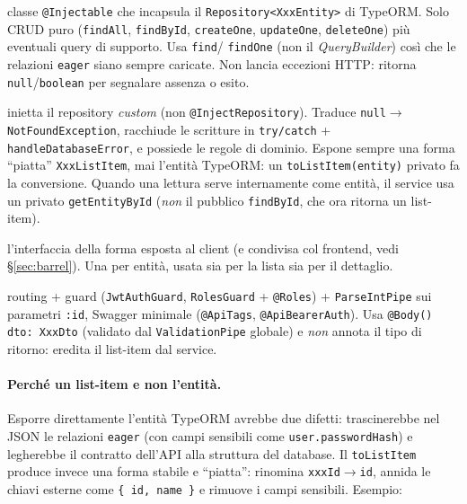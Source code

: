 \documentclass[11pt,a4paper,oneside]{report}
\newcommand{\code}[1]{\texttt{\small #1}}
\newcommand{\file}[1]{\texttt{\small #1}}
\begin{document}
\begin{description}[leftmargin=1.6em,style=nextline]
  \item[Repository (\file{xxx.repository.ts})] classe \code{@Injectable} che
        incapsula il \code{Repository<XxxEntity>} di TypeORM. Solo CRUD puro
        (\code{findAll}, \code{findById}, \code{createOne}, \code{updateOne},
        \code{deleteOne}) più eventuali query di supporto. Usa \code{find}/
        \code{findOne} (non il \emph{QueryBuilder}) così che le relazioni
        \code{eager} siano sempre caricate. Non lancia eccezioni HTTP: ritorna
        \code{null}/\code{boolean} per segnalare assenza o esito.
  \item[Service (\file{xxx.service.ts})] inietta il repository \emph{custom} (non
        \code{@InjectRepository}). Traduce \code{null}$\rightarrow$
        \code{NotFoundException}, racchiude le scritture in \code{try/catch} +
        \code{handleDatabaseError}, e possiede le regole di dominio. Espone
        sempre una forma ``piatta'' \code{XxxListItem}, mai l'entità TypeORM: un
        \code{toListItem(entity)} privato fa la conversione. Quando una lettura
        serve internamente come entità, il service usa un privato
        \code{getEntityById} (\emph{non} il pubblico \code{findById}, che ora
        ritorna un list-item).
  \item[List-item (\file{interfaces/xxx-list-item.interface.ts})] l'interfaccia
        della forma esposta al client (e condivisa col frontend, vedi
        \S\ref{sec:barrel}). Una per entità, usata sia per la lista sia per il
        dettaglio.
  \item[Controller (\file{xxx.controller.ts})] routing + guard
        (\code{JwtAuthGuard}, \code{RolesGuard} + \code{@Roles}) +
        \code{ParseIntPipe} sui parametri \code{:id}, Swagger minimale
        (\code{@ApiTags}, \code{@ApiBearerAuth}). Usa \code{@Body() dto: XxxDto}
        (validato dal \code{ValidationPipe} globale) e \emph{non} annota il tipo
        di ritorno: eredita il list-item dal service.
\end{description}

\paragraph{Perché un list-item e non l'entità.} Esporre direttamente l'entità
TypeORM avrebbe due difetti: trascinerebbe nel JSON le relazioni \code{eager}
(con campi sensibili come \code{user.passwordHash}) e legherebbe il contratto
dell'API alla struttura del database. Il \code{toListItem} produce invece una
forma stabile e ``piatta'': rinomina \code{xxxId}$\rightarrow$\code{id}, annida
le chiavi esterne come \code{\{ id, name \}} e rimuove i campi sensibili. Esempio:
\end{document}
